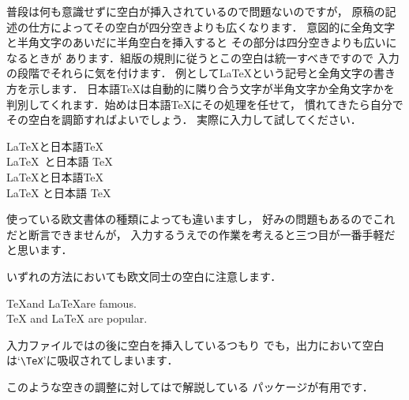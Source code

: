 {普段は何も意識せずに空白が挿入されているので問題ないのですが，
原稿の記述の仕方によってその空白が四分空きよりも広くなります．
意図的に全角文字と半角文字のあいだに半角空白を挿入すると
その部分は四分空きよりも広いになるときが
あります．組版の規則に従うとこの空白は統一すべきですので
入力の段階でそれらに気を付けます．
例として{\LaTeX}という記号と全角文字の書き方を示します．
日本語{\TeX}は自動的に隣り合う文字が半角文字か全角文字かを
判別してくれます．始めは日本語{\TeX}にその処理を任せて，
慣れてきたら自分でその空白を調節すればよいでしょう．
実際に入力して試してください．
%
%
\begin{InOut}
\LaTeX と日本語\TeX     \\
\LaTeX\ と日本語 \TeX   \\
{\LaTeX}と日本語{\TeX}  \\
{\LaTeX} と日本語 {\TeX}\\
\end{InOut}
使っている欧文書体の種類によっても違いますし，
好みの問題もあるのでこれだと断言できませんが，
入力するうえでの作業を考えると三つ目が一番手軽だと思います．

いずれの方法においても欧文同士の空白に注意します．
\begin{InOut}
\TeX and \LaTeX are famous.\\
{\TeX} and {\LaTeX} are popular.
\end{InOut}
入力ファイルではの後に空白を挿入しているつもり
でも，出力において空白は`\verb|\TeX|'に吸収されてしまいます．

このような空きの調整に対してはで解説している
パッケージが有用です．


}
